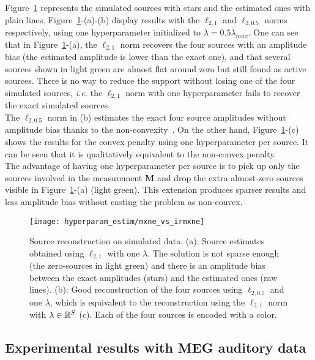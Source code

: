 Figure~\ref{fig:mxne_vs_irmxne} represents the simulated sources with stars and the estimated ones with plain lines. Figure~\ref{fig:mxne_vs_irmxne}-(a)-(b) display results with the $\ell_{2,1}$ and $\ell_{2,0.5}$ norms respectively, using one hyperparameter initialized to $\lambda=0.5\lambda_{max}$. One can see that in Figure~\ref{fig:mxne_vs_irmxne}-(a), the $\ell_{2,1}$ norm recovers the four sources with an amplitude bias (the estimated amplitude is lower than the exact one), and that several sources shown in light green are almost flat around zero but still found as active sources. There is no way to reduce the support without losing one of the four simulated sources, \textit{i.e.} the $\ell_{2,1}$ norm with one hyperparameter fails to recover the exact simulated sources.\\
The $\ell_{2,0.5}$ norm in (b) estimates the exact four source amplitudes without amplitude bias thanks to the non-convexity~\cite{irMxNE}. On the other hand, Figure~\ref{fig:mxne_vs_irmxne}-(c) shows the results for the convex penalty using one hyperparameter per source. It can be seen that it is qualitatively equivalent to the non-convex penalty. \\

The advantage of having one hyperparameter per source is to pick up only the sources involved in the measurement $\mathbf{M}$ and drop the extra almost-zero sources visible in Figure~\ref{fig:mxne_vs_irmxne}-(a) (light green). This extension produces sparser results and less amplitude bias without casting the problem as non-convex. %

\begin{figure}
	\texttt{[image: hyperparam\_estim/mxne\_vs\_irmxne]}
    \caption{Source reconstruction on simulated data. (a): Source estimates obtained using $\ell_{2,1}$ with one $\lambda$. The solution is not sparse enough (the zero-sources in light green) and there is an amplitude bias between the exact amplitudes (stars) and the estimated ones (raw lines). (b): Good reconstruction of the four sources using $\ell_{2,0.5}$ and one $\lambda$, which is equivalent to the reconstruction using the $\ell_{2,1}$ norm with $\lambda\in\mathbb{R}^S$ (c). Each of the four sources is encoded with a color.
    }
    \label{fig:mxne_vs_irmxne}
\end{figure}

\subsection{Experimental results with MEG auditory data}


